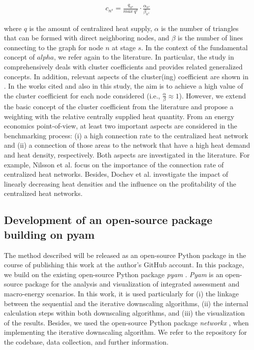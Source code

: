\begin{align}\label{eq:2}
c_{n^{s}}=\frac{q_{n^{s}}}{max~q^{s}}\cdot \frac{\alpha_{n^{s}}}{\beta_{n^{s}}}
\end{align}

where $q$ is the amount of centralized heat supply, $\alpha$ is the number of triangles that can be formed with direct neighboring nodes, and $\beta$ is the number of lines connecting to the graph for node $n$ at stage $s$. In the context of the fundamental concept of $alpha$, we refer again to the literature. In particular, the study in \cite{huang2010link} comprehensively deals with cluster coefficients and provides related generalized concepts. In addition, relevant aspects of the cluster(ing) coefficient are shown in \cite{cui2014detecting}. In the works cited and also in this study, the aim is to achieve a high value of the cluster coefficient for each node considered (i.e., $\frac{\alpha}{\beta} \approx 1$). However, we extend the basic concept of the cluster coefficient from the literature and propose a weighting with the relative centrally supplied heat quantity. From an energy economics point-of-view, at least two important aspects are considered in the benchmarking process: (i) a high connection rate to the centralized heat network and (ii) a connection of those areas to the network that have a high heat demand and heat density, respectively. Both aspects are investigated in the literature. For example, Nilsson et al. \cite{nilsson2008sparse} focus on the importance of the connection rate of centralized heat networks. Besides, Dochev et al. \cite{dochev2018analysing} investigate the impact of linearly decreasing heat densities and the influence on the profitability of the centralized heat networks.

\subsection{Development of an open-source package building on pyam}\label{open}
The method described will be released as an open-source Python package in the course of publishing this work at the author's GitHub account. In this package, we build on the existing open-source Python package \textit{pyam} \cite{huppmann2021pyam}. \textit{Pyam} is an open-source package for the analysis and visualization of integrated assessment and macro-energy scenarios. In this work, it is used particularly for (i) the linkage between the sequential and the iterative downscaling algorithms, (ii) the internal calculation steps within both downscaling algorithms, and (iii) the visualization of the results. Besides, we used the open-source Python package \textit{networkx} \cite{hagberg2008exploring}, when implementing the iterative downscaling algorithm. We refer to the repository for the codebase, data collection, and further information. 
